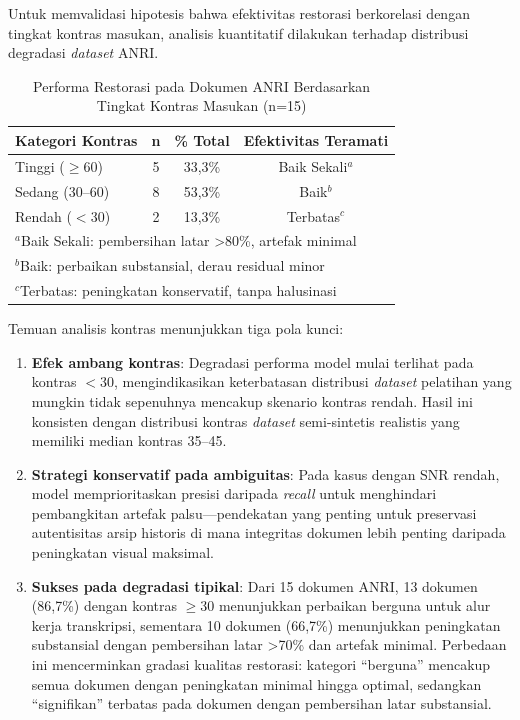 \documentclass[12pt,a4paper]{article}
\begin{document}
Untuk memvalidasi hipotesis bahwa efektivitas restorasi berkorelasi dengan tingkat kontras masukan, analisis kuantitatif dilakukan terhadap distribusi degradasi \textit{dataset} ANRI.

\begin{table}[!t]
\renewcommand{\arraystretch}{1.3}
\caption{Performa Restorasi pada Dokumen ANRI Berdasarkan Tingkat Kontras Masukan (n=15)}
\label{table:anri_contrast_analysis}
\centering
\small
\begin{tabular}{|l|c|c|c|}
\hline
\textbf{Kategori Kontras} & \textbf{n} & \textbf{\% Total} & \textbf{Efektivitas Teramati} \\
\hline
Tinggi ($\geq$60) & 5 & 33,3\% & Baik Sekali$^a$ \\
Sedang (30--60) & 8 & 53,3\% & Baik$^b$ \\
Rendah ($<$30) & 2 & 13,3\% & Terbatas$^c$ \\
\hline
\multicolumn{4}{l}{\footnotesize $^a$Baik Sekali: pembersihan latar >80\%, artefak minimal} \\
\multicolumn{4}{l}{\footnotesize $^b$Baik: perbaikan substansial, derau residual minor} \\
\multicolumn{4}{l}{\footnotesize $^c$Terbatas: peningkatan konservatif, tanpa halusinasi} \\
\end{tabular}
\end{table}

Temuan analisis kontras menunjukkan tiga pola kunci:
\begin{enumerate}[nosep]
    \item \textbf{Efek ambang kontras}: Degradasi performa model mulai terlihat pada kontras $<$30, mengindikasikan keterbatasan distribusi \textit{dataset} pelatihan yang mungkin tidak sepenuhnya mencakup skenario kontras rendah. Hasil ini konsisten dengan distribusi kontras \textit{dataset} semi-sintetis realistis yang memiliki median kontras 35--45.
    
    \item \textbf{Strategi konservatif pada ambiguitas}: Pada kasus dengan SNR rendah, model memprioritaskan presisi daripada \textit{recall} untuk menghindari pembangkitan artefak palsu---pendekatan yang penting untuk preservasi autentisitas arsip historis di mana integritas dokumen lebih penting daripada peningkatan visual maksimal.
    
    \item \textbf{Sukses pada degradasi tipikal}: Dari 15 dokumen ANRI, 13 dokumen (86,7\%) dengan kontras $\geq$30 menunjukkan perbaikan berguna untuk alur kerja transkripsi, sementara 10 dokumen (66,7\%) menunjukkan peningkatan substansial dengan pembersihan latar >70\% dan artefak minimal. Perbedaan ini mencerminkan gradasi kualitas restorasi: kategori ``berguna'' mencakup semua dokumen dengan peningkatan minimal hingga optimal, sedangkan ``signifikan'' terbatas pada dokumen dengan pembersihan latar substansial.
\end{enumerate}
\end{document}
